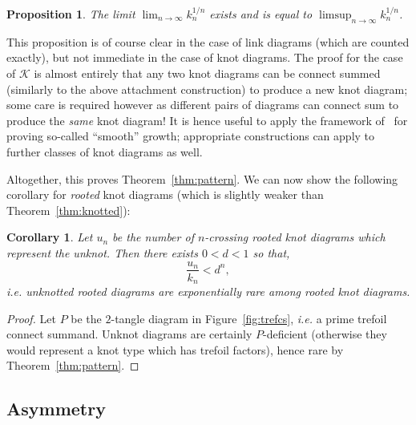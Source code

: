 \documentclass[submission%
]{dmtcs}
\newcommand{\KnotDiaClass}{\mathscr{K}}
\newcommand{\KnotDiaCard}{k}
\newtheorem{corollary}{Corollary}
\newtheorem{proposition}{Proposition}
\begin{document}
\begin{proposition}
  The limit $\lim_{n\to\infty}{\KnotDiaCard_n^{1/n}}$ exists and is
  equal to $\limsup_{n\to\infty}{\KnotDiaCard_n^{1/n}}$.
\end{proposition}

This proposition is of course clear in the case of link diagrams
(which are counted exactly), but not immediate in the case of knot
diagrams. The proof for the case of $\KnotDiaClass$ is almost entirely
that any two knot diagrams can be connect summed (similarly to the
above attachment construction) to produce a new knot diagram; some
care is required however as different pairs of diagrams can connect
sum to produce the \emph{same} knot diagram! It is hence useful to
apply the framework of~\cite{Bender1992104} for proving so-called
``smooth'' growth; appropriate constructions can apply to further
classes of knot diagrams as well.

Altogether, this proves Theorem~\ref{thm:pattern}. We can now show the
following corollary for \emph{rooted} knot diagrams (which is slightly
weaker than Theorem~\ref{thm:knotted}):

\begin{corollary}
  \label{thm:rootknotted}
  Let $u_n$ be the number of $n$-crossing \emph{rooted} knot diagrams which
  represent the unknot. Then there exists $0< d < 1$ so that,
  \begin{displaymath}
    \frac{u_n}{k_n} < d^n,
  \end{displaymath}
  \textit{i.e.} unknotted \emph{rooted} diagrams are exponentially
  rare among \emph{rooted} knot diagrams.
\end{corollary}

\begin{proof}
  Let $P$ be the $2$-tangle diagram in Figure~\ref{fig:trefcs},
  \textit{i.e.} a prime trefoil connect summand. Unknot diagrams are
  certainly $P$-deficient (otherwise they would represent a knot type
  which has trefoil factors), hence rare by Theorem~\ref{thm:pattern}.
\end{proof}

\subsection{Asymmetry}
\label{sec:asymmetry}
\end{document}
